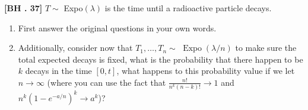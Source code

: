 \begin{exercise}
	\textbf{[BH . 37]}  $T\sim $   Expo$(\lambda)$ is the time until a radioactive particle decays.
	\begin{enumerate}
		\item First answer the original questions in your own words.		
		\item Additionally, consider now that $T_1, \ldots, T_n \sim$ $\operatorname{Expo}(\lambda/n)$ to make sure the total expected decays is fixed, what is the probability that there happen to be $k$ decays in the time $[0,t]$, what happens to this probability value if we let $n\rightarrow\infty$ (where you can use the fact that $\frac{n!}{n^k (n-k)!} \rightarrow 1$ and $n^k (1-e^{-a/n})^k \rightarrow a^k$)? 
	\end{enumerate} 

\end{exercise}